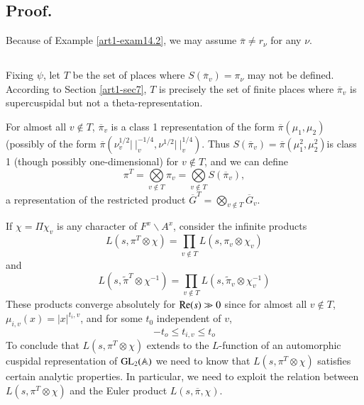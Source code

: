 \setcounter{subsection}{1}
\subsection{Proof.}\label{art1-sec15.2}
Because of Example \ref{art1-exam14.2}, we may assume $\overline{\pi}\neq r_{\nu}$ for any $\nu$.

\subsection{}\label{art1-sec15.3}
Fixing $\psi$, let $T$ be the set of places where $S(\overline{\pi}_{v})=\pi_{\nu}$ may not be defined. According to Section \ref{art1-sec7}, $T$ is precisely the set of finite places where $\overline{\pi}_{v}$ is supercuspidal but not a theta-representation.

For almost all $v\not\in T$, $\overline{\pi}_{v}$ is a class 1 representation of the form $\overline{\pi}(\mu_{1},\mu_{2})$ (possibly of the form $\overline{\pi}(\nu^{1/2}_{v}|~|_{v}^{-1/4},\nu^{1/2}|~|_{v}^{1/4})$. Thus $S(\overline{\pi}_{v})=\overline{\pi}(\mu^{2}_{1},\mu^{2}_{2})$\pageoriginale is class 1 (though possibly one-dimensional) for $v\not\in T$, and we can define
\setcounter{equation}{0}
\begin{equation}
\pi^{T}=\bigotimes\limits_{v\not\in T}\pi_{v}=\bigotimes\limits_{v\not\in T}S(\overline{\pi}_{v}),\label{art1-eq15.3.1}
\end{equation}
a representation of the restricted product $\overline{G}^{T}=\bigotimes\limits_{v\not\in T}\overline{G}_{v}$.

If $\chi=\Pi \chi_{v}$ is any character of $F^{x}\backslash A^{x}$, consider the infinite products 
\begin{equation}
L(s,\pi^{T}\otimes \chi)=\prod\limits_{v\not\in T}L(s,\pi_{v}\otimes \chi_{v})\label{art1-eq15.3.2}
\end{equation}
and
$$
L(s,\widetilde{\pi}^{T}\otimes \chi^{-1})=\prod\limits_{v\not\in T}L(s,\widetilde{\pi}_{v}\otimes \chi_{v}^{-1})
$$
These products converge absolutely for $\mathrm{Re}(s)\gg 0$ since for almost all $v\not\in T$, $\mu_{i,v}(x)=|x|^{t_{i},v}$, and for some $t_{0}$ independent of $v$,
\begin{equation}
-t_{o}\leq t_{i,v}\leq t_{o}\label{art1-eq15.3.3}
\end{equation}
To conclude that $L(s,\pi^{T}\otimes \chi)$ extends to the $L$-function of an automorphic cuspidal representation of $\mathrm{GL}_{2}(\mathbb{A})$ we need to know that $L(s,\pi^{T}\otimes \chi)$ satisfies certain analytic properties. In particular, we need to exploit the relation between $L(s,\pi^{T}\otimes \chi)$ and the Euler product $L(s,\overline{\pi},\chi)$.

